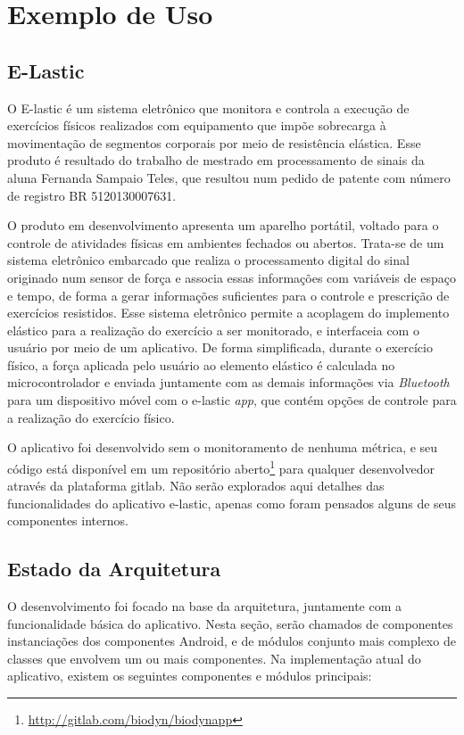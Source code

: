 \chapter{Exemplo de Uso}
\label{cap:elastic}

\section{E-Lastic}
O E-lastic é um sistema eletrônico que monitora e controla a execução de exercícios físicos realizados com equipamento que impõe sobrecarga à movimentação de segmentos corporais por meio de resistência elástica. Esse produto é resultado do trabalho de mestrado em processamento de sinais da aluna Fernanda Sampaio Teles, que resultou num pedido de patente com número de registro BR 5120130007631.

O produto em desenvolvimento apresenta um aparelho portátil, voltado para o controle de atividades físicas em ambientes fechados ou abertos. Trata-se de um sistema eletrônico embarcado que realiza o processamento digital do sinal originado num sensor de força e associa essas informações com variáveis de espaço e tempo, de forma a gerar informações suficientes para o controle e prescrição de exercícios resistidos. Esse sistema eletrônico permite a acoplagem do implemento elástico para a realização do exercício a ser monitorado, e interfaceia com o usuário por meio de um aplicativo. De forma simplificada, durante o exercício físico, a força aplicada pelo usuário ao elemento elástico é calculada no microcontrolador e enviada juntamente com as demais informações via \textit{Bluetooth} para um dispositivo móvel com o e-lastic \textit{app}, que contém opções de controle para a realização do exercício físico.

O aplicativo foi desenvolvido sem o monitoramento de nenhuma métrica, e seu código está disponível em um repositório aberto\footnote{\url{http://gitlab.com/biodyn/biodynapp}} para qualquer desenvolvedor através da plataforma gitlab. Não serão explorados aqui detalhes das funcionalidades do aplicativo e-lastic, apenas como foram pensados alguns de seus componentes internos.

\section{Estado da Arquitetura}

O desenvolvimento foi focado na base da arquitetura, juntamente com a funcionalidade básica do aplicativo. Nesta seção, serão chamados de componentes instanciações dos componentes Android, e de módulos conjunto mais complexo de classes que envolvem um ou mais componentes. Na implementação atual do aplicativo, existem os seguintes componentes e módulos principais:

